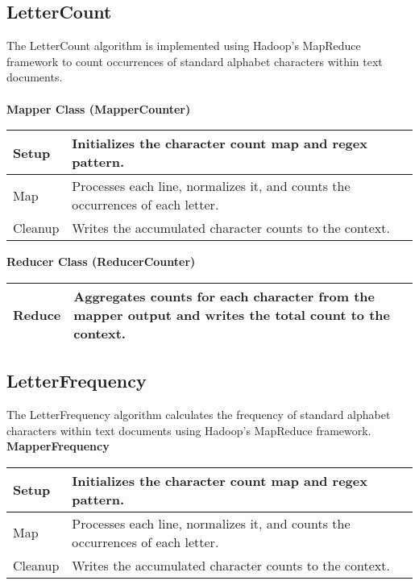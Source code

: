 \subsection{LetterCount}
The LetterCount algorithm is implemented using Hadoop's MapReduce framework to count occurrences of standard alphabet characters within text documents. \\ \\
\textbf{Mapper Class (MapperCounter)}
\begin{longtable}{|>{\raggedright\arraybackslash}p{}|>{\raggedright\arraybackslash}p{}|}
    \hline
    Setup &  Initializes the character count map and regex pattern.\\
    \hline
    Map &  Processes each line, normalizes it, and counts the occurrences of each letter.\\
    \hline
    Cleanup &Writes the accumulated character counts to the context.\\
    \hline
\end{longtable}



\textbf{Reducer Class (ReducerCounter)}
\begin{longtable}{|>{\raggedright\arraybackslash}p{}|>{\raggedright\arraybackslash}p{}|}
    \hline
    Reduce & Aggregates counts for each character from the mapper output and writes the total count to the context. \\
    \hline
\end{longtable}



\subsection{LetterFrequency}

The LetterFrequency algorithm calculates the frequency of standard alphabet characters within text documents using Hadoop's MapReduce framework.\\

\textbf{MapperFrequency}
\begin{longtable}{|>{\raggedright\arraybackslash}p{}|>{\raggedright\arraybackslash}p{}|}
    \hline
    Setup &   Initializes the character count map and regex pattern.\\
    \hline
    Map &  Processes each line, normalizes it, and counts the occurrences of each letter.\\
    \hline
    Cleanup & Writes the accumulated character counts to the context.\\
    \hline
\end{longtable}


